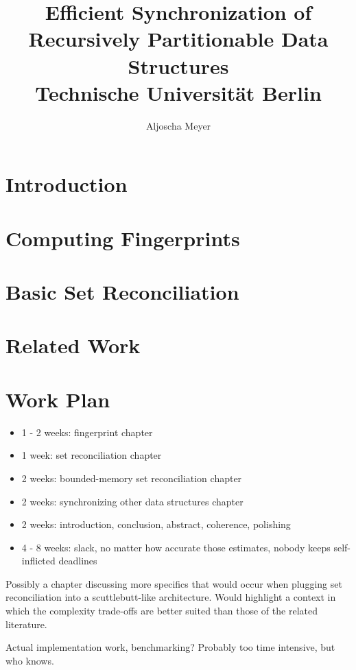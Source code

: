 \documentclass[12pt,twoside]{report}
\title{
{Efficient Synchronization of Recursively Partitionable Data Structures}\\
{\large Technische Universität Berlin}
}
\author{Aljoscha Meyer}
\begin{document}
\maketitle



\tableofcontents

\chapter{Introduction}
\label{introduction}


\chapter{Computing Fingerprints}
\label{fingerprints}


\chapter{Basic Set Reconciliation}
\label{basic-set-reconciliation}


\chapter{Related Work}
\label{related-work}




\chapter{Work Plan}

\begin{itemize}
\item 1 - 2 weeks: fingerprint chapter
\item 1 week: set reconciliation chapter
\item 2 weeks: bounded-memory set reconciliation chapter
\item 2 weeks: synchronizing other data structures chapter
\item 2 weeks: introduction, conclusion, abstract, coherence, polishing
\item 4 - 8 weeks: slack, no matter how accurate those estimates, nobody keeps self-inflicted deadlines
\end{itemize}

Possibly a chapter discussing more specifics that would occur when plugging set reconciliation into a scuttlebutt-like architecture. Would highlight a context in which the complexity trade-offs are better suited than those of the related literature.

Actual implementation work, benchmarking? Probably too time intensive, but who knows.



\end{document}
